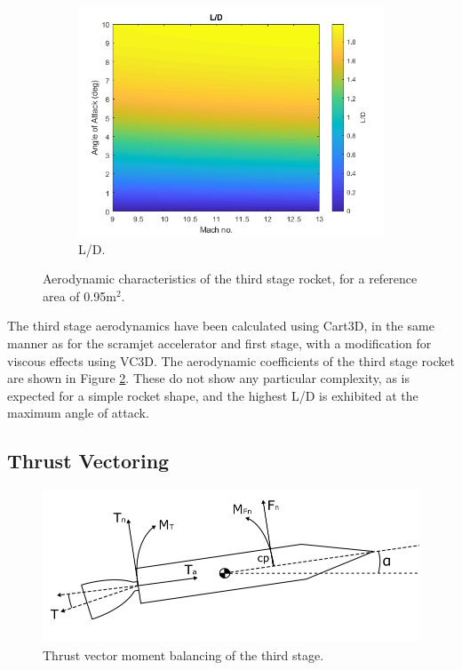 \begin{figure}[ht]
\begin{subfigure}{.5\textwidth}
					\includegraphics[width=0.99\linewidth]{figures/3_vehicle_design/ThirdStageLD}
					\caption{L/D.}
					\label{fig:LD-ThirdStage}
				\end{subfigure}
				\caption{Aerodynamic characteristics of the third stage rocket, for a reference area of 0.95m$^2$.} %
				\label{fig:ThirdStageAero}
			\end{figure}
			\noindent
			The third stage aerodynamics have been calculated using Cart3D, in the same manner as for the  scramjet accelerator and first stage, with a modification for viscous effects using VC3D.
		The aerodynamic coefficients of the third stage rocket are shown in Figure \ref{fig:ThirdStageAero}. These do not show any particular complexity, as is expected for a simple rocket shape, and the highest L/D is exhibited at the maximum angle of attack. 
		
	
		
		
		
		\subsection{Thrust Vectoring}\label{sec:thrustvectoring}
		\begin{figure}[ht]
			\centering
			\includegraphics[width=0.7\linewidth]{figures/3_vehicle_design/ThrustVec}
			\caption{Thrust vector moment balancing of the third stage.}
			\label{fig:ThrustVec}
		\end{figure}
		
